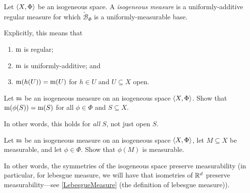 \begin{dfn}
Let $\langle X,\Phi\rangle$ be an isogeneous space.  A \emph{isogeneous measure} is a uniformly-additive regular measure for which $\widetilde{\mathcal{B}}_\Phi$ is a uniformly-measurable base.
\begin{rmk}
Explicitly, this means that
\begin{enumerate}
\item $\mathrm{m}$ is regular;
\item $\mathrm{m}$ is uniformly-additive; and
\item $\mathrm{m} (h(U))=\mathrm{m} (U)$ for $h\in U$ and $U\subseteq X$ open.
\end{enumerate}
\end{rmk}
\end{dfn}
\begin{exr}
Let $\mathrm{m}$ be an isogeneous measure on an isogeneous space $\langle X,\Phi\rangle$.  Show that $\mathrm{m} (\phi (S))=\mathrm{m} (S)$ for all $\phi \in \Phi$ and $S\subseteq X$.
\begin{rmk}
In other words, this holds for \emph{all} $S$, not just open $S$.
\end{rmk}
\end{exr}
\begin{exr}
Let $\mathrm{m}$ be an isogeneous measure on an isogeneous space $\langle X,\Phi\rangle$, let $M\subseteq X$ be measurable, and let $\phi \in \Phi$.  Show that $\phi (M)$ is measurable.
\begin{rmk}
In other words, the symmetries of the isogeneous space preserve measurability (in particular, for lebesgue measure, we will have that isometries of $\mathbb{R} ^d$ preserve measurability---see \cref{LebesgueMeasure} (the definition of lebesgue measure)).
\end{rmk}
\end{exr}

